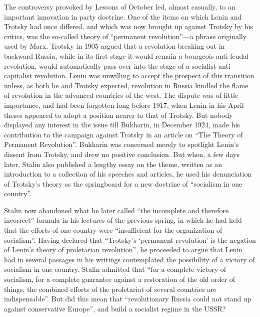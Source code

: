 The controversy provoked by Lessons of October led, almost casually, to an important innovation in party doctrine. One of the items on which Lenin and Trotsky had once differed, and which was now brought up against Trotsky by his critics, was the so-called theory of ``permanent revolution''---a phrase originally used by Marx. Trotsky in 1905 argued that a revolution breaking out in backward Russia, while in its first stage it would remain a bourgeois anti-feudal revolution, would automatically pass over into the stage of a socialist anti-capitalist revolution. Lenin was unwilling to accept the prospect of this transition unless, as both he and Trotsky expected, revolution in Russia kindled the flame of revolution in the advanced countries of the west. The dispute was of little importance, and had been forgotten long before 1917, when Lenin in his April theses appeared to adopt a position nearer to that of Trotsky. But nobody displayed any interest in the issue till Bukharin, in December 1924, made his contribution to the campaign against Trotsky in an article on ``The Theory of Permanent Revolution''. Bukharin was concerned merely to spotlight Lenin's dissent from Trotsky, and drew no positive conclusion. But when, a few days later, Stalin also published a lengthy essay on the theme, written as an introduction to a collection of his speeches and articles, he used his denunciation of Trotsky's theory as the springboard for a new doctrine of ``socialism in one country''. 

Stalin now abandoned what he later called ``the incomplete and therefore incorrect'' formula in his lectures of the previous spring, in which he had held that the efforts of one country were ``insufficient for the organization of socialism''. Having declared that ``Trotsky's `permanent revolution' is the negation of Lenin's theory of proletarian revolution'', he proceeded to argue that Lenin had in several passages in his writings contemplated the possibility of a victory of socialism in one country. Stalin admitted that ``for a complete victory of socialism, for a complete guarantee against a restoration of the old order of things, the combined efforts of the proletariat of several countries are indispensable''. But did this mean that ``revolutionary Russia could not stand up against conservative Europe'', and build a socialist regime in the USSR? 

